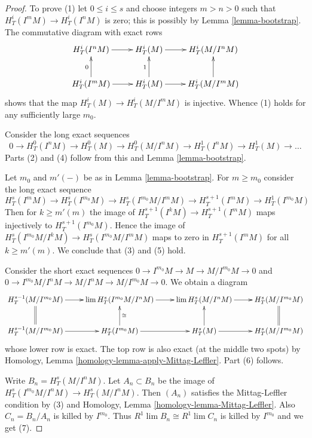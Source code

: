 \documentclass{stacks-project}
\theoremstyle{plain}
\theoremstyle{definition}
\theoremstyle{remark}
\numberwithin{equation}{subsection}
\def\lim{\mathop{\mathrm{lim}}\nolimits}
\begin{document}
\begin{proof}
To prove (1) let $0 \leq i \leq s$ and choose integers $m > n > 0$ such that
$H^i_T(I^mM) \to H^i_T(I^nM)$ is zero; this is possibly by
Lemma \ref{lemma-bootstrap}. The commutative diagram with exact rows
$$
\xymatrix{
H^i_T(I^nM) \ar[r] &
H^i_T(M) \ar[r] &
H^i_T(M/I^nM) \\
H^i_T(I^mM) \ar[r] \ar[u]^0 &
H^i_T(M) \ar[r] \ar[u]^1 &
H^i_T(M/I^mM) \ar[u] \\
}
$$
shows that the map $H^i_T(M) \to H^i_T(M/I^mM)$ is injective. Whence (1) holds
for any sufficiently large $m_0$.

\medskip\noindent
Consider the long exact sequences
$$
0 \to H^0_T(I^nM) \to H^0_T(M) \to
H^0_T(M/I^nM) \to H^1_T(I^nM) \to
H^1_T(M) \to \ldots
$$
Parts (2) and (4) follow from this and Lemma \ref{lemma-bootstrap}.

\medskip\noindent
Let $m_0$ and $m'(-)$ be as in Lemma \ref{lemma-bootstrap}.
For $m \geq m_0$ consider the long exact sequence
$$
H^s_T(I^mM) \to H^s_T(I^{m_0}M) \to
H^s_T(I^{m_0}M/I^mM) \to H^{s + 1}_T(I^mM) \to
H^1_T(I^{m_0}M)
$$
Then for $k \geq m'(m)$ the image of
$H^{s + 1}_T(I^kM) \to H^{s + 1}_T(I^mM)$
maps injectively to $H^{s + 1}_T(I^{m_0}M)$.
Hence the image of
$H^s_T(I^{m_0}M/I^kM) \to H^s_T(I^{m_0}M/I^mM)$
maps to zero in $H^{s + 1}_T(I^mM)$ for all $k \geq m'(m)$.
We conclude that (3) and (5) hold.

\medskip\noindent
Consider the short exact sequences
$0 \to I^{m_0}M \to M \to M/I^{m_0} M \to 0$ and
$0 \to I^{m_0}M/I^nM \to M/I^nM \to M/I^{m_0} M \to 0$.
We obtain a diagram
$$
\xymatrix{
H^{s - 1}_T(M/I^{m_0}M) \ar[r] &
\lim H^s_T(I^{m_0}M/I^nM) \ar[r] &
\lim H^s_T(M/I^nM) \ar[r] &
H^s_T(M/I^{m_0}M) \\
H^{s - 1}_T(M/I^{m_0}M) \ar[r] \ar@{=}[u] &
H^s_T(I^{m_0}M) \ar[r] \ar[u]_{\cong} &
H^s_T(M) \ar[r] \ar[u] &
H^s_T(M/I^{m_0}M) \ar@{=}[u]
}
$$
whose lower row is exact. The top row is also exact
(at the middle two spots) by
Homology, Lemma \ref{homology-lemma-apply-Mittag-Leffler}.
Part (6) follows.

\medskip\noindent
Write $B_n = H^s_T(M/I^nM)$. Let $A_n \subset B_n$
be the image of $H^s_T(I^{m_0}M/I^nM) \to H^s_T(M/I^nM)$.
Then $(A_n)$ satisfies the Mittag-Leffler condition by (3) and
Homology, Lemma \ref{homology-lemma-Mittag-Leffler}.
Also $C_n = B_n/A_n$ is killed by $I^{m_0}$. Thus
$R^1\lim B_n \cong R^1\lim C_n$ is killed by $I^{m_0}$ and we get (7).
\end{proof}
\end{document}
